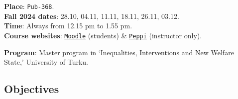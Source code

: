 \documentclass[letterpaper]{article}
\begin{document}
{\bf Place}: \texttt{Pub-368}.\\
{\bf Fall 2024 dates}: 28.10, 04.11, 11.11, 18.11, 26.11, 03.12.\\
{\bf Time}: Always from 12.15 pm to 1.55 pm.\\

{\bf Course websites}: \href{https://moodle.utu.fi/course/view.php?id=33451}{\texttt{Moodle}} (students) \& \href{https://planner.peppi.utu.fi/group/opettajan-tyopoyta/toteutusten-hallinta?p_p_id=RealizationPortlet_WAR_realizationportlet&p_p_lifecycle=0&p_p_state=normal&p_p_mode=view&_RealizationPortlet_WAR_realizationportlet_struts.portlet.action=%2Frealization%2Fbasic&realization.realizationId=45184}{\texttt{Peppi}} (instructor only).




{\bf Program}: Master program in `Inequalities, Interventions and New Welfare State,' University of Turku.%





\subsection*{Objectives}

\end{document}
